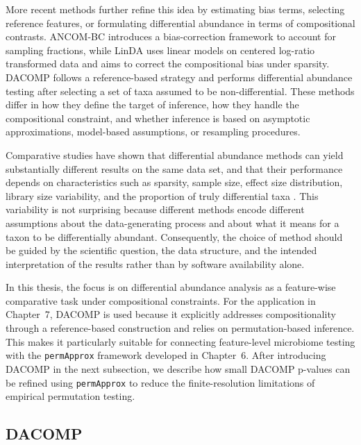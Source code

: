 More recent methods further refine this idea by estimating bias terms, selecting reference features, or formulating differential abundance in terms of compositional contrasts. ANCOM-BC \citep{lin2020analysis} introduces a bias-correction framework to account for sampling fractions, while LinDA \citep{zhou2022linda} uses linear models on centered log-ratio transformed data and aims to correct the compositional bias under sparsity. DACOMP \citep{brill2022testing} follows a reference-based strategy and performs differential abundance testing after selecting a set of taxa assumed to be non-differential. These methods differ in how they define the target of inference, how they handle the compositional constraint, and whether inference is based on asymptotic approximations, model-based assumptions, or resampling procedures.

Comparative studies have shown that differential abundance methods can yield substantially different results on the same data set, and that their performance depends on characteristics such as sparsity, sample size, effect size distribution, library size variability, and the proportion of truly differential taxa \citep{weiss2017normalization,nearing2022microbiome}. This variability is not surprising because different methods encode different assumptions about the data-generating process and about what it means for a taxon to be differentially abundant. Consequently, the choice of method should be guided by the scientific question, the data structure, and the intended interpretation of the results rather than by software availability alone.

In this thesis, the focus is on differential abundance analysis as a feature-wise comparative task under compositional constraints. For the application in Chapter~7, DACOMP is used because it explicitly addresses compositionality through a reference-based construction and relies on permutation-based inference. This makes it particularly suitable for connecting feature-level microbiome testing with the \texttt{permApprox} framework developed in Chapter~6. After introducing DACOMP in the next subsection, we describe how small DACOMP p-values can be refined using \texttt{permApprox} to reduce the finite-resolution limitations of empirical permutation testing.

\subsection{DACOMP}
\label{sec:4feature:dacomp}

